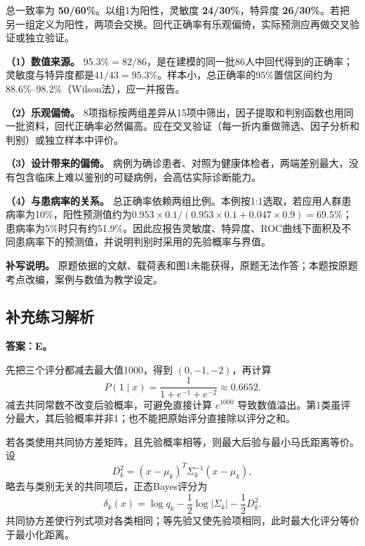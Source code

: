 总一致率为 \textbf{50/60\%}。以组1为阳性，灵敏度 \textbf{24/30\%}，特异度 \textbf{26/30\%}。若把另一组定义为阳性，两项会交换。回代正确率有乐观偏倚，实际预测应再做交叉验证或独立验证。



\textbf{（1）数值来源。} \(95.3\%=82/86\)，是在建模的同一批86人中回代得到的正确率；灵敏度与特异度都是\(41/43=95.3\%\)。样本小，总正确率的95\%置信区间约为88.6\%--98.2\%（Wilson法），应一并报告。

\textbf{（2）乐观偏倚。} 8项指标按两组差异从15项中筛出，因子提取和判别函数也用同一批资料，回代正确率必然偏高。应在交叉验证（每一折内重做筛选、因子分析和判别）或独立样本中评价。

\textbf{（3）设计带来的偏倚。} 病例为确诊患者、对照为健康体检者，两端差别最大，没有包含临床上难以鉴别的可疑病例，会高估实际诊断能力。

\textbf{（4）与患病率的关系。} 总正确率依赖两组比例。本例按1:1选取，若应用人群患病率为10\%，阳性预测值约为\(0.953\times0.1/(0.953\times0.1+0.047\times0.9)=69.5\%\)；患病率为5\%时只有约51.9\%。因此应报告灵敏度、特异度、ROC曲线下面积及不同患病率下的预测值，并说明判别时采用的先验概率与界值。

\textbf{补写说明。} 原题依据的文献、载荷表和图1未能获得，原题无法作答；本题按原题考点改编，案例与数值为教学设定。


\subsection{补充练习解析}


\textbf{答案：E。}

先把三个评分都减去最大值1000，得到 \((0,-1,-2)\)，再计算 \[P(1\mid x)=\frac{1}{1+e^{-1}+e^{-2}}\approx0.6652.\] 减去共同常数不改变后验概率，可避免直接计算 \(e^{1000}\) 导致数值溢出。第1类虽评分最大，其后验概率并非1；也不能把原始评分直接除以评分之和。





若各类使用共同协方差矩阵，且先验概率相等，则最大后验与最小马氏距离等价。设 \[D_k^2=(x-\mu_k)^T\Sigma_k^{-1}(x-\mu_k),\] 略去与类别无关的共同项后，正态Bayes评分为 \[\delta_k(x)=\log q_k-\frac12\log|\Sigma_k|-\frac12D_k^2.\] 共同协方差使行列式项对各类相同；等先验又使先验项相同，此时最大化评分等价于最小化距离。

